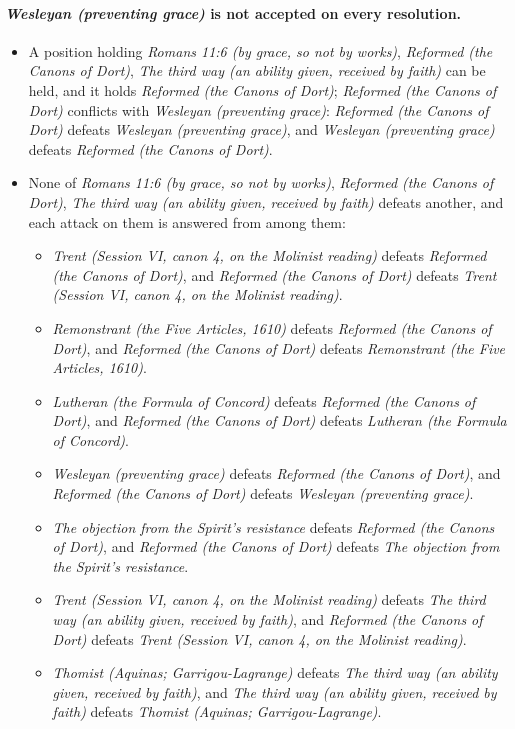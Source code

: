 \documentclass[11pt]{article}
\begin{document}
\paragraph{\emph{Wesleyan (preventing grace)} is not accepted on every resolution.}
\begin{itemize}
\item A position holding \emph{Romans 11:6 (by grace, so not by works)}, \emph{Reformed (the Canons of Dort)}, \emph{The third way (an ability given, received by faith)} can be held, and it holds \emph{Reformed (the Canons of Dort)}; \emph{Reformed (the Canons of Dort)} conflicts with \emph{Wesleyan (preventing grace)}: \emph{Reformed (the Canons of Dort)} defeats \emph{Wesleyan (preventing grace)}, and \emph{Wesleyan (preventing grace)} defeats \emph{Reformed (the Canons of Dort)}.
\item None of \emph{Romans 11:6 (by grace, so not by works)}, \emph{Reformed (the Canons of Dort)}, \emph{The third way (an ability given, received by faith)} defeats another, and each attack on them is answered from among them:
\begin{itemize}
\item \emph{Trent (Session VI, canon 4, on the Molinist reading)} defeats \emph{Reformed (the Canons of Dort)}, and \emph{Reformed (the Canons of Dort)} defeats \emph{Trent (Session VI, canon 4, on the Molinist reading)}.
\item \emph{Remonstrant (the Five Articles, 1610)} defeats \emph{Reformed (the Canons of Dort)}, and \emph{Reformed (the Canons of Dort)} defeats \emph{Remonstrant (the Five Articles, 1610)}.
\item \emph{Lutheran (the Formula of Concord)} defeats \emph{Reformed (the Canons of Dort)}, and \emph{Reformed (the Canons of Dort)} defeats \emph{Lutheran (the Formula of Concord)}.
\item \emph{Wesleyan (preventing grace)} defeats \emph{Reformed (the Canons of Dort)}, and \emph{Reformed (the Canons of Dort)} defeats \emph{Wesleyan (preventing grace)}.
\item \emph{The objection from the Spirit’s resistance} defeats \emph{Reformed (the Canons of Dort)}, and \emph{Reformed (the Canons of Dort)} defeats \emph{The objection from the Spirit’s resistance}.
\item \emph{Trent (Session VI, canon 4, on the Molinist reading)} defeats \emph{The third way (an ability given, received by faith)}, and \emph{Reformed (the Canons of Dort)} defeats \emph{Trent (Session VI, canon 4, on the Molinist reading)}.
\item \emph{Thomist (Aquinas; Garrigou-Lagrange)} defeats \emph{The third way (an ability given, received by faith)}, and \emph{The third way (an ability given, received by faith)} defeats \emph{Thomist (Aquinas; Garrigou-Lagrange)}.
\end{itemize}
\end{itemize}
\end{document}
